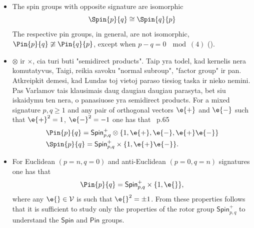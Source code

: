 \begin{unit}
\begin{itemize}
\item[$\bullet$]  The spin groups with opposite signature are
isomorphic
  \[
    \Spin{p}{q}\cong \Spin{q}{p}
  \]
 The respective pin groups, in general, are not isomorphic, $\Pin{p}{q}\ncong \Pin{q}{p}$, except when $p-q=0\ \mod (4)$
 ().
%
\item[$\bullet$]  $\otimes$ ir $\times$, cia turi buti
"semidirect products". Taip yra todel, kad kernelis nera
komutatyvus, Taigi, reikia savoku "normal subroup", "factor group"
ir pan. Atkreipkit demesi, kad Lundas toj vietoj paraso tiesiog
taska ir nieko nemini. Pas Varlamov tais klausimais daug daugiau
daugiau parasyta, bet siu iskaidymu ten nera, o panasiuose yra
semidirect products.
 For a mixed signature $p,q\ge 1$ and any pair
of orthogonal vectors $\e{+}$ and $\e{-}$ such that $\e{+}^2=1$,
$\e{-}^2=-1$ one has that~\cite{Lundholm09} p.65
\[\begin{split}
&\Pin{p}{q}=\mathsf{Spin}^{+}_{p,q}\otimes\{1,\e{+},\e{-},\e{+}\e{-}\}\\
&\Spin{p}{q}=\mathsf{Spin}^{+}_{p,q}\times\{1,\e{+}\e{-}\}.\\
\end{split}\]
\item[$\bullet$] For Euclidean $(p=n,q=0)$ and anti-Euclidean
$(p=0,q=n)$ signatures one has that
\[\Pin{p}{q}=\mathsf{Spin}^{+}_{p,q}\times\{1,\e{}\}, \]
where any $\e{}\in\mathcal{V}$ is such that $\e{}^2=\pm 1$. From
these properties follows  that it is sufficient to study only the
properties of the rotor group $\mathsf{Spin}^{+}_{p,q}$ to
understand the $\mathsf{Spin}$ and $\mathsf{Pin}$ groups.
\end{itemize}
\end{unit}
%
